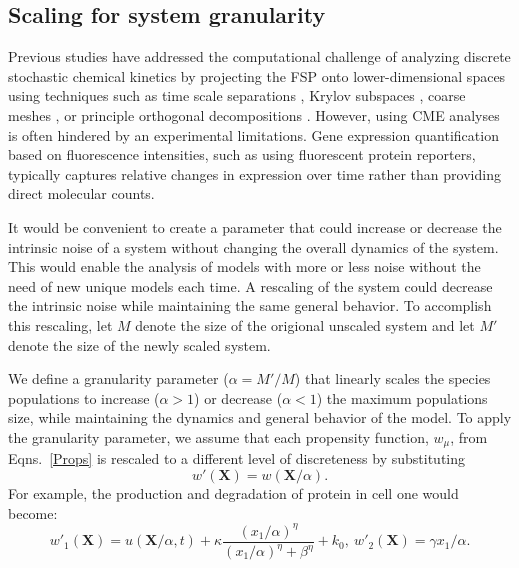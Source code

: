 \documentclass[12pt]{article}
\begin{document}
\subsection{Scaling for system granularity}
Previous studies have addressed the computational challenge of analyzing discrete stochastic chemical kinetics by projecting the FSP onto lower-dimensional spaces using techniques such as time scale separations \cite{Peles2006}, Krylov subspaces \cite{Macnemara&Sidje?}, coarse meshes \cite{Munsky2008IEEE,Tapia2012CDC}, or principle orthogonal decompositions \cite{Vo2019}. However, using CME analyses is often hindered by an experimental limitations.  Gene expression quantification based on fluorescence intensities, such as using fluorescent protein reporters, typically captures relative changes in expression over time rather than providing direct molecular counts.

It would be convenient to create a parameter that could increase or decrease the intrinsic noise of a system without changing the overall dynamics of the system. This would enable the analysis of models with more or less noise without the need of new unique models each time.  A rescaling of the system could decrease the intrinsic noise while maintaining the same general behavior. 
To accomplish this rescaling, let $M$ denote the size of the origional unscaled system and let $M'$ denote the size of the newly scaled system.

We define a granularity parameter ($\alpha=M'/M$) that linearly scales the species populations to increase ($\alpha>1$) or decrease ($\alpha<1$) the maximum populations size, while maintaining the dynamics and general behavior of the model. To apply the granularity parameter, we assume that each propensity function, $w_{\mu}$, from Eqns.\ \ref{Props} is rescaled to a different level of discreteness by substituting
\begin{equation}
w'(\mathbf{X})=w(\mathbf{X}/\alpha).
\end{equation}
For example, the production and degradation of protein in cell one would become:
\begin{equation}
w'_1(\mathbf{X}) = u(\mathbf{X}/\alpha,t)  + \kappa \frac{(x_1/\alpha)^\eta}{(x_1/\alpha)^{\eta}+\beta^{\eta}} + k_0,\ w'_2(\mathbf{X}) = \gamma x_1/\alpha.
\end{equation}
\end{document}
